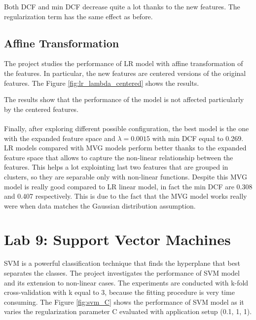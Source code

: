 \documentclass{article}
\begin{document}
Both DCF and min DCF decrease quite a lot thanks to the new features. The regularization term has the same effect as before.

\subsection{Affine Transformation}
The project studies the performance of LR model with affine transformation of the features. In particular, the new features are centered versions of the original features. The Figure \ref{fig:lr_lambda_centered} shows the results.

The results show that the performance of the model is not affected particularly by the centered features.\\\\

Finally, after exploring different possible configuration, the best model is the one with the expanded feature space and $\lambda = 0.0015$ with min DCF equal to 0.269. LR models compared with MVG models perform better thanks to the expanded feature space that allows to capture the non-linear relationship between the features. This helps a lot explointing last two features that are grouped in clusters, so they are separable only with non-linear functions. Despite this MVG model is really good compared to LR linear model, in fact the min DCF are 0.308 and 0.407 respectively. This is due to the fact that the MVG model works really were when data matches the Gaussian distribution assumption.

\section{Lab 9: Support Vector Machines}
\label{sec:svm}
SVM is a powerful classification technique that finds the hyperplane that best separates the classes. The project investigates the performance of SVM model and its extension to non-linear cases. The experiments are conducted with k-fold cross-validation with k equal to 3, because the fitting procedure is very time consuming. The Figure \ref{fig:svm_C} shows the performance of SVM model as it varies the regularization parameter C evaluated with application setup (0.1, 1, 1).
\end{document}

